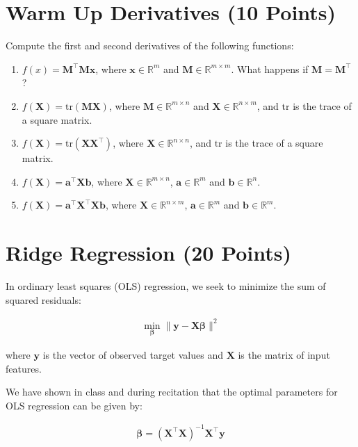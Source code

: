 \section{Warm Up Derivatives (10 Points)}
Compute the first and second derivatives of the following functions:
\begin{enumerate}
    \item $f(x) = \mathbf{M}^\top \mathbf{M} \mathbf{x}$, where $\mathbf{x} \in \mathbb{R}^m$ and $\mathbf{M} \in \mathbb{R}^{m \times m}$. What happens if $\mathbf{M} = \mathbf{M}^\top$?
    \item $f(\mathbf{X}) = \text{tr}(\mathbf{M}\mathbf{X})$, where $\mathbf{M} \in \mathbb{R}^{m \times n}$ and $\mathbf{X} \in \mathbb{R}^{n \times m}$, and $\text{tr}$ is the trace of a square matrix.
    \item $f(\mathbf{X}) = \text{tr}(\mathbf{X} \mathbf{X}^\top)$, where $\mathbf{X} \in \mathbb{R}^{n \times n}$, and $\text{tr}$ is the trace of a square matrix.
    \item $f(\mathbf{X}) = \mathbf{a}^\top \mathbf{X} \mathbf{b}$, where $\mathbf{X} \in \mathbb{R}^{m \times n}$, $\mathbf{a} \in \mathbb{R}^m$ and $\mathbf{b} \in \mathbb{R}^n$.
    \item $f(\mathbf{X}) = \mathbf{a}^\top \mathbf{X}^\top \mathbf{X} \mathbf{b}$, where $\mathbf{X} \in \mathbb{R}^{n \times m}$, $\mathbf{a} \in \mathbb{R}^m$ and $\mathbf{b} \in \mathbb{R}^m$.
\end{enumerate}

\section{Ridge Regression (20 Points)}
In ordinary least squares (OLS) regression, we seek to minimize the sum of squared residuals:

\begin{align}
\min_{\boldsymbol{\beta}} \|\mathbf{y} - \mathbf{X} \boldsymbol{\beta} \|^2
\end{align}

where $\mathbf{y}$ is the vector of observed target values and $\mathbf{X}$ is the matrix of input features.

We have shown in class and during recitation that the optimal parameters for OLS regression can be given by:

\begin{align}
\boldsymbol{\beta} = (\mathbf{X}^\top \mathbf{X})^{-1} \mathbf{X}^\top \mathbf{y}
\end{align}

